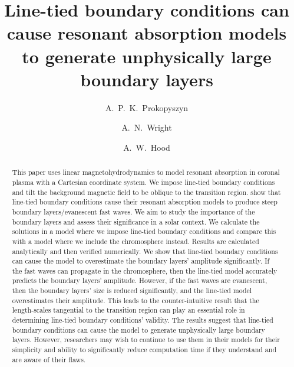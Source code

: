 \documentclass[linenumbers]{aastex63}
\begin{document}
\title{Line-tied boundary conditions can cause resonant absorption models to generate unphysically large boundary layers}


\author[0000-0002-8184-5990]{A.~P.~K.~Prokopyszyn}

\author[0000-0002-9877-1457]{A.~N.~Wright}

\author[0000-0003-2620-2068]{A.~W.~Hood}


\begin{abstract}

This paper uses linear magnetohydrodynamics to model resonant absorption in coronal plasma with a Cartesian coordinate system. We impose line-tied boundary conditions and tilt the background magnetic field to be oblique to the transition region. \citet{Halberstadt1993,Halberstadt1995,Goedbloed1994,Arregui2003} show that line-tied boundary conditions cause their resonant absorption models to produce steep boundary layers/evanescent fast waves. We aim to study the importance of the boundary layers and assess their significance in a solar context. We calculate the solutions in a model where we impose line-tied boundary conditions and compare this with a model where we include the chromosphere instead. Results are calculated analytically and then verified numerically. We show that line-tied boundary conditions can cause the model to overestimate the boundary layers' amplitude significantly. If the fast waves can propagate in the chromosphere, then the line-tied model accurately predicts the boundary layers' amplitude. However, if the fast waves are evanescent, then the boundary layers' size is reduced significantly, and the line-tied model overestimates their amplitude. This leads to the counter-intuitive result that the length-scales tangential to the transition region can play an essential role in determining line-tied boundary conditions' validity. The results suggest that line-tied boundary conditions can cause the model to generate unphysically large boundary layers. However, researchers may wish to continue to use them in their models for their simplicity and ability to significantly reduce computation time if they understand and are aware of their flaws.

\end{abstract}
\end{document}
